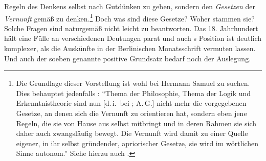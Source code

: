 Regeln des Denkens selbst nach Gutdünken zu geben, sondern den \emph{Gesetzen}
der \emph{Vernunft} gemäß zu denken.\footnote{Die Grundlage dieser Vorstellung
ist wohl bei Hermann Samuel
zu suchen. Dies behauptet jedenfalls
\textcite[][25]{Hinske:ReimaruszwischenWolffundKant1980}:
\enquote{Thema der Philosophie, Thema der Logik und Erkenntnistheorie sind nun
[d.\,i.\ bei
;
A.\,G.] nicht mehr die vorgegebenen Gesetze, an denen sich die Vernunft zu
orientieren hat, sondern eben jene Regeln, die sie von Hause aus selbst
mitbringt und in deren Rahmen sie sich daher auch zwangsläufig bewegt. Die
Vernunft wird damit zu einer Quelle eigener, in ihr selbst gründender,
apriorischer Gesetze, sie wird im wörtlichen Sinne autonom.} Siehe hierzu auch
\cite{Arndt:DieLogikvonReimarusimVerhaeltniszumRationalismusderAufklaerungsphilosophie1980}.}
Doch was sind diese Gesetze? Woher stammen sie? Solche Fragen sind naturgemäß
nicht leicht zu beantworten. Das 18.
Jahrhundert hält eine Fülle an verschiedenen Deutungen parat und auch
s Position ist deutlich komplexer, als die Auskünfte in der
Berlinischen Monatsschrift vermuten lassen. Und auch der soeben genannte
positive Grundsatz bedarf noch der Auslegung.

